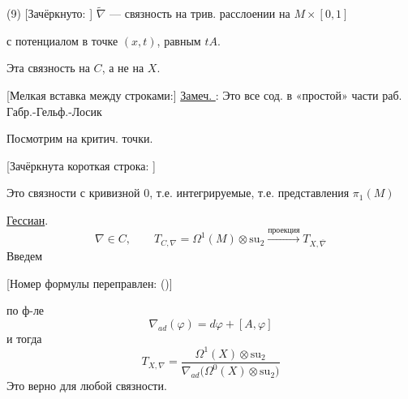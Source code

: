(9) [Зачёркнуто: ]
$\widetilde\nabla$ — связность на трив. расслоении на $M\times[0,1]$

с потенциалом в точке $(x,t)$, равным $tA$.

Эта связность на $C$, а не на $X$.

[Мелкая вставка между строками:]
\underline{Замеч. }:
Это все сод. в «простой» части раб. Габр.-Гельф.-Лосик

Посмотрим на критич. точки.

[Зачёркнута короткая строка:
]

Это связности с кривизной 0, т.е. интегрируемые, т.е.
представления $\pi_1(M)$

\underline{Гессиан}.
\begin{equation*}
\nabla\in C,\qquad
T_{C,\nabla}=\Omega^1(M)\otimes\mathrm{su}_2
\overset{\text{проекция}}{\longrightarrow}T_{X,\overline\nabla}
\tag{10}
\end{equation*}
Введем

[Номер формулы переправлен:
()]
\begin{center}
\end{center}
по ф-ле
\begin{equation*}
\nabla_{ad}(\varphi)=d\varphi+[A,\varphi]
\tag{12}
\end{equation*}
и тогда
\begin{equation*}
T_{X,\nabla}=
\frac{\Omega^1(X)\otimes\mathrm{su}_2}
{\nabla_{ad}\bigl(\Omega^0(X)\otimes\mathrm{su}_2\bigr)}
\tag{13}
\end{equation*}
Это верно для любой связности.


